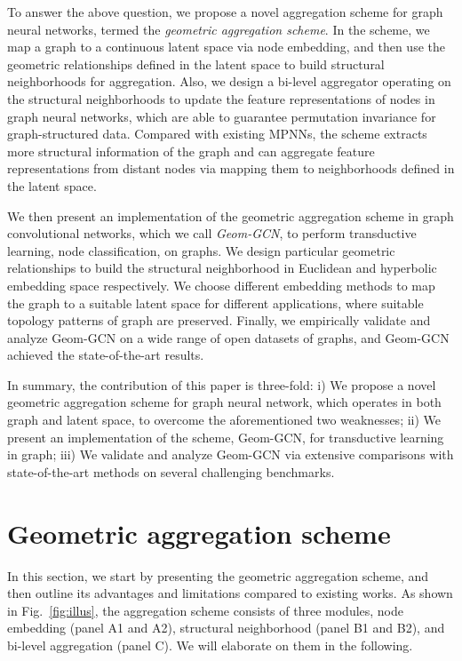 \documentclass{article} \usepackage{iclr2020_conference,times}
\begin{document}
To answer the above question, we propose a novel aggregation scheme for graph neural networks, termed the \emph{geometric aggregation scheme}. 
In the scheme, we map a graph to a continuous latent space via node embedding, and then use the geometric relationships defined in the latent space to build structural neighborhoods for aggregation.
Also, we design a bi-level aggregator operating on the structural neighborhoods to update the feature representations of nodes in graph neural networks, which are able to guarantee permutation invariance for graph-structured data.
Compared with existing MPNNs, the scheme extracts more structural information of the graph and can aggregate feature representations from distant nodes via mapping them to neighborhoods defined in the latent space.

We then present an implementation of the geometric aggregation scheme in graph convolutional networks, which we call \emph{Geom-GCN}, to perform transductive learning, node classification, on graphs.
We design particular geometric relationships to build the structural neighborhood in Euclidean and hyperbolic embedding space respectively.
We choose different embedding methods to map the graph to a suitable latent space for different applications, where suitable topology patterns of graph are preserved. 
Finally, we empirically validate and analyze Geom-GCN on a wide range of open datasets of graphs, and Geom-GCN achieved the state-of-the-art results.

In summary, the contribution of this paper is three-fold:
i) We propose a novel geometric aggregation scheme for graph neural network, which operates in both graph and latent space, to overcome the aforementioned two weaknesses;
ii) We present an implementation of the scheme, Geom-GCN, for transductive learning in graph;
iii) We validate and analyze Geom-GCN via extensive comparisons with state-of-the-art methods on several challenging benchmarks.

\vspace{-2mm}
\section{Geometric aggregation scheme}
\vspace{-1mm}
In this section, we start by presenting the geometric aggregation scheme, and then outline its advantages and limitations compared to existing works.
As shown in Fig.~\ref{fig:illus}, the aggregation scheme consists of three modules, node embedding (panel A1 and A2), structural neighborhood (panel B1 and B2), and bi-level aggregation (panel C). We will elaborate on them in the following.
\end{document}
